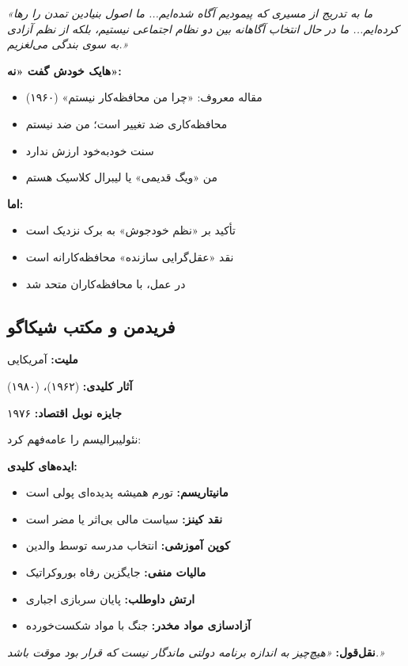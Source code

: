 \begin{quotebox}
\textit{«ما به تدریج از مسیری که پیمودیم آگاه شده‌ایم... ما اصول بنیادین تمدن را رها کرده‌ایم... ما در حال انتخاب آگاهانه بین دو نظام اجتماعی نیستیم، بلکه از نظم آزادی به سوی بندگی می‌لغزیم.»}
\end{quotebox}

\begin{debatebox}
\textbf{هایک خودش گفت «نه»:}
\begin{itemize}[nosep]
    \item مقاله معروف: «چرا من محافظه‌کار نیستم» (۱۹۶۰)
    \item محافظه‌کاری ضد تغییر است؛ من ضد نیستم
    \item سنت خودبه‌خود ارزش ندارد
    \item من «ویگ قدیمی» یا لیبرال کلاسیک هستم
\end{itemize}

\textbf{اما:}
\begin{itemize}[nosep]
    \item تأکید بر «نظم خودجوش» به برک نزدیک است
    \item نقد «عقل‌گرایی سازنده» محافظه‌کارانه است
    \item در عمل، با محافظه‌کاران متحد شد
\end{itemize}
\end{debatebox}

\subsection{فریدمن و مکتب شیکاگو}

\begin{personbox}

\textbf{ملیت:} آمریکایی

\textbf{آثار کلیدی:}  (۱۹۶۲)،  (۱۹۸۰)

\textbf{جایزه نوبل اقتصاد:} ۱۹۷۶

\mediumspace

 نئولیبرالیسم را عامه‌فهم کرد:

\textbf{ایده‌های کلیدی:}
\begin{itemize}[nosep]
    \item \textbf{مانیتاریسم:} تورم همیشه پدیده‌ای پولی است
    \item \textbf{نقد کینز:} سیاست مالی بی‌اثر یا مضر است
    \item \textbf{کوپن آموزشی:} انتخاب مدرسه توسط والدین
    \item \textbf{مالیات منفی:} جایگزین رفاه بوروکراتیک
    \item \textbf{ارتش داوطلب:} پایان سربازی اجباری
    \item \textbf{آزادسازی مواد مخدر:} جنگ با مواد شکست‌خورده
\end{itemize}

\mediumspace

\textbf{نقل‌قول:} \textit{«هیچ‌چیز به اندازه برنامه دولتی ماندگار نیست که قرار بود موقت باشد.»}
\end{personbox}


